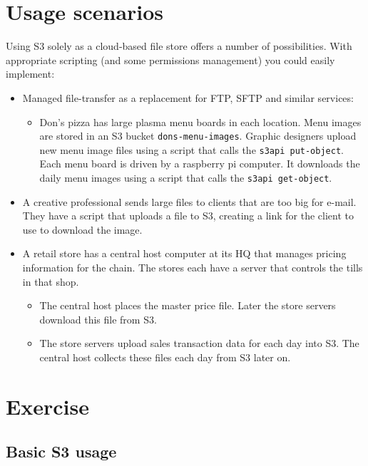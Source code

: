 \documentclass{pgnotes}
\begin{document}
\section{Usage scenarios}

Using S3 solely as a cloud-based file store offers a number of possibilities.
With appropriate scripting (and some permissions management) you could easily implement: 

\begin{itemize}
\item Managed file-transfer as a replacement for FTP, SFTP and similar services:
  \begin{itemize}
  \item
    Don's pizza has large plasma menu boards in each location.
    Menu images are stored in an S3 bucket \texttt{dons-menu-images}. 
    Graphic designers upload new menu image files using a script that calls the \texttt{s3api put-object}.
    Each menu board is driven by a raspberry pi computer.
    It downloads the daily menu images using a script that calls the \texttt{s3api get-object}. 
  \end{itemize}
\item
  A creative professional sends large files to clients that are too big for e-mail.
  They have a script that uploads a file to S3, creating a link for the client to use to download the image.
\item
  A retail store has a central host computer at its HQ that manages pricing information for the chain.
  The stores each have a server that controls the tills in that shop.
  \begin{itemize}
  \item The central host places the master price file.
    Later the store servers download this file from S3.
  \item The store servers upload sales transaction data for each day into S3.
    The central host collects these files each day from S3 later on.  
  \end{itemize}
\end{itemize}


\section{Exercise}

\subsection{Basic S3 usage}
\end{document}
